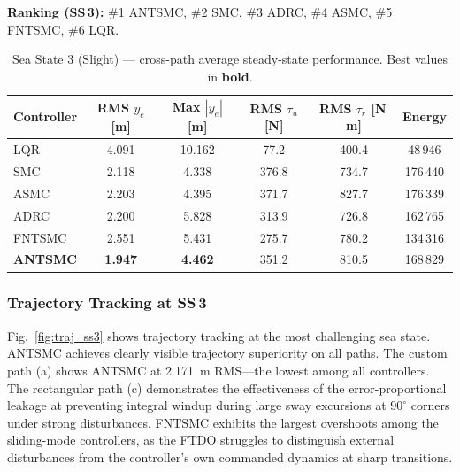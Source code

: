 \documentclass[review]{cas-dc}
\begin{document}
\textbf{Ranking (SS\,3):} \#1 ANTSMC, \#2 SMC, \#3 ADRC, \#4 ASMC, \#5 FNTSMC, \#6 LQR.

\begin{table}[t]
\centering
\caption{Sea State 3 (Slight) --- cross-path average steady-state performance. Best values in \textbf{bold}.}
\label{tab:ss3}
\begin{tabular}{lccccc}
\toprule
Controller & RMS $y_e$ [m] & Max $|y_e|$ [m] & RMS $\tau_u$ [N] & RMS $\tau_r$ [N\,m] & Energy \\
\midrule
LQR & 4.091 & 10.162 & 77.2 & 400.4 & 48\,946 \\
SMC & 2.118 & 4.338 & 376.8 & 734.7 & 176\,440 \\
ASMC & 2.203 & 4.395 & 371.7 & 827.7 & 176\,339 \\
ADRC & 2.200 & 5.828 & 313.9 & 726.8 & 162\,765 \\
FNTSMC & 2.551 & 5.431 & 275.7 & 780.2 & 134\,316 \\
\textbf{ANTSMC} & \textbf{1.947} & \textbf{4.462} & 351.2 & 810.5 & 168\,829 \\
\bottomrule
\end{tabular}
\end{table}

\subsubsection{Trajectory Tracking at SS\,3}

Fig.~\ref{fig:traj_ss3} shows trajectory tracking at the most challenging sea state. ANTSMC achieves clearly visible trajectory superiority on all paths. The custom path (a) shows ANTSMC at 2.171~m RMS---the lowest among all controllers. The rectangular path (c) demonstrates the effectiveness of the error-proportional leakage at preventing integral windup during large sway excursions at $90^\circ$ corners under strong disturbances. FNTSMC exhibits the largest overshoots among the sliding-mode controllers, as the FTDO struggles to distinguish external disturbances from the controller's own commanded dynamics at sharp transitions.
\end{document}
